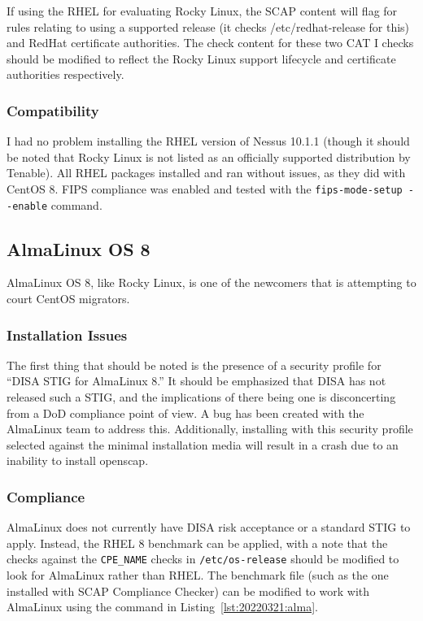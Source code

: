 If using the RHEL for evaluating Rocky Linux, the SCAP content will flag for rules relating to using a supported release (it checks /etc/redhat-release for this) and RedHat certificate authorities. The check content for these two CAT I checks should be modified to reflect the Rocky Linux support lifecycle and certificate authorities respectively.

\subsubsection{Compatibility}
I had no problem installing the RHEL version of Nessus 10.1.1 (though it should be noted that Rocky Linux is not listed as an officially supported distribution by Tenable). All RHEL packages installed and ran without issues, as they did with CentOS 8. FIPS compliance was enabled and tested with the \texttt{fips-mode-setup -{}-enable} command.

\subsection{AlmaLinux OS 8}
AlmaLinux OS 8, like Rocky Linux, is one of the newcomers that is attempting to court CentOS migrators.

\subsubsection{Installation Issues}
The first thing that should be noted is the presence of a security profile for ``DISA STIG for AlmaLinux 8.'' It should be emphasized that DISA has not released such a STIG, and the implications of there being one is disconcerting from a DoD compliance point of view. A bug has been created with the AlmaLinux team to address this.\autocite{20220321:almabug} Additionally, installing with this security profile selected against the minimal installation media will result in a crash due to an inability to install openscap.

\subsubsection{Compliance}
AlmaLinux does not currently have DISA risk acceptance or a standard STIG to apply. Instead, the RHEL 8 benchmark can be applied, with a note that the checks against the \texttt{CPE\_NAME} checks in \texttt{/etc/os-release} should be modified to look for AlmaLinux rather than RHEL. The benchmark file (such as the one installed with SCAP Compliance Checker) can be modified to work with AlmaLinux using the command in Listing~\ref{lst:20220321:alma}.

